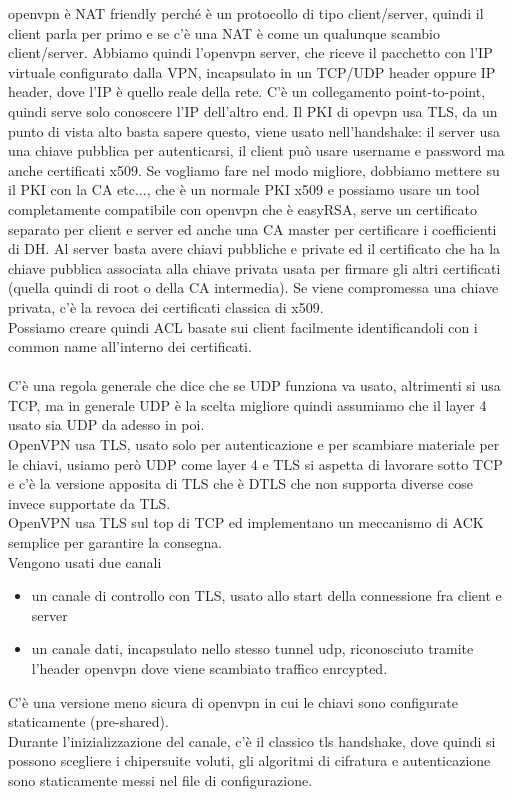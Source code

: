 \documentclass[12pt, oneside]{extbook} %
\begin{document}
openvpn è NAT friendly perché è un protocollo di tipo client/server, quindi il client parla per primo e se c'è una NAT è come un qualunque scambio client/server. Abbiamo quindi l'openvpn server, che riceve il pacchetto con l'IP virtuale configurato dalla VPN, incapsulato in un TCP/UDP header oppure IP header, dove l'IP è quello reale della rete. C'è un collegamento point-to-point, quindi serve solo conoscere l'IP dell'altro end. Il PKI di opevpn usa TLS, da un punto di vista alto basta sapere questo, viene usato nell'handshake: il server usa una chiave pubblica per autenticarsi, il client può usare username e password ma anche certificati x509. Se vogliamo fare nel modo migliore, dobbiamo mettere su il PKI con la CA etc..., che è un normale PKI x509 e possiamo usare un tool completamente compatibile con openvpn che è easyRSA, serve un certificato separato per client e server ed anche una CA master per certificare i coefficienti di DH. Al server basta avere chiavi pubbliche e private ed il certificato che ha la chiave pubblica associata alla chiave privata usata per firmare gli altri certificati (quella quindi di root o della CA intermedia). Se viene compromessa una chiave privata, c'è la revoca dei certificati classica di x509.\\Possiamo creare quindi ACL basate sui client facilmente identificandoli con i common name all'interno dei certificati.\\\\C'è una regola generale che dice che se UDP funziona va usato, altrimenti si usa TCP, ma in generale UDP è la scelta migliore quindi assumiamo che il layer 4 usato sia UDP da adesso in poi.\\OpenVPN usa TLS, usato solo per autenticazione e per scambiare materiale per le chiavi, usiamo però UDP come layer 4 e TLS si aspetta di lavorare sotto TCP e c'è la versione apposita di TLS che è DTLS che non supporta diverse cose invece supportate da TLS.\\OpenVPN usa TLS sul top di TCP ed implementano un meccanismo di ACK semplice per garantire la consegna.\\Vengono usati due canali
\begin{itemize}
\item un canale di controllo con TLS, usato allo start della connessione fra client e server
\item un canale dati, incapsulato nello stesso tunnel udp, riconosciuto tramite l'header openvpn dove viene scambiato traffico enrcypted.
\end{itemize}
C'è una versione meno sicura di openvpn in cui le chiavi sono configurate staticamente (pre-shared).\\Durante l'inizializzazione del canale, c'è il classico tls handshake, dove quindi si possono scegliere i chipersuite voluti, gli algoritmi di cifratura e autenticazione sono staticamente messi nel file di configurazione.
\end{document}

